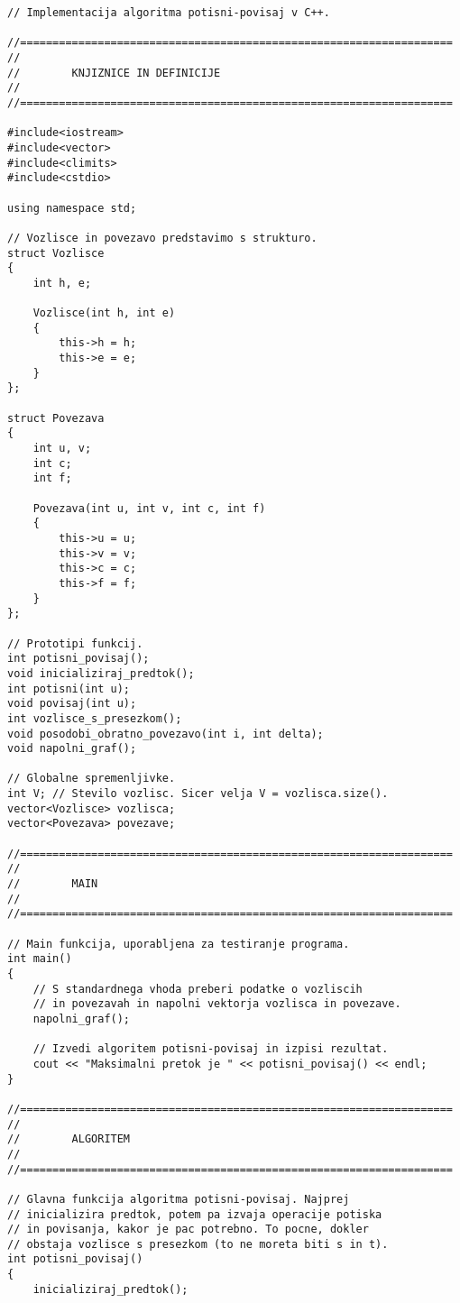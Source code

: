 \documentclass[mat1]{fmfdelo}
\begin{document}
\begin{verbatim}
// Implementacija algoritma potisni-povisaj v C++.

//===================================================================
//
//        KNJIZNICE IN DEFINICIJE
//
//===================================================================

#include<iostream>
#include<vector>
#include<climits>
#include<cstdio>

using namespace std;

// Vozlisce in povezavo predstavimo s strukturo.
struct Vozlisce
{
    int h, e;
    
    Vozlisce(int h, int e)
    {
        this->h = h;
        this->e = e;
    }
};

struct Povezava
{
    int u, v;
    int c;
    int f;
    
    Povezava(int u, int v, int c, int f)
    {
        this->u = u;
        this->v = v;
        this->c = c;
        this->f = f;
    }
};

// Prototipi funkcij.
int potisni_povisaj();
void inicializiraj_predtok();
int potisni(int u);
void povisaj(int u);
int vozlisce_s_presezkom();
void posodobi_obratno_povezavo(int i, int delta);
void napolni_graf();

// Globalne spremenljivke.
int V; // Stevilo vozlisc. Sicer velja V = vozlisca.size().
vector<Vozlisce> vozlisca;
vector<Povezava> povezave;

//===================================================================
//
//        MAIN
//
//===================================================================

// Main funkcija, uporabljena za testiranje programa.
int main()
{
    // S standardnega vhoda preberi podatke o vozliscih
    // in povezavah in napolni vektorja vozlisca in povezave.
    napolni_graf();
    
    // Izvedi algoritem potisni-povisaj in izpisi rezultat.
    cout << "Maksimalni pretok je " << potisni_povisaj() << endl;
}

//===================================================================
//
//        ALGORITEM
//
//===================================================================

// Glavna funkcija algoritma potisni-povisaj. Najprej
// inicializira predtok, potem pa izvaja operacije potiska
// in povisanja, kakor je pac potrebno. To pocne, dokler
// obstaja vozlisce s presezkom (to ne moreta biti s in t).
int potisni_povisaj()
{
    inicializiraj_predtok();
    

\end{verbatim}
\end{document}
